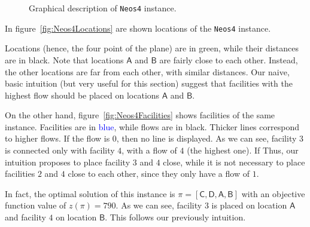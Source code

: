 \begin{figure}%
	\centering
	\qquad
	\caption{Graphical description of \texttt{Neos4} instance.}
	\label{fig:Neos4instance}
\end{figure}

In figure~\ref{fig:Neos4Locations}  are shown locations of the \texttt{Neos4} instance. 

Locations (hence, the four point of the plane) are in 
 \textcolor{verdescuro}{green}, while their distances are in black. Note that locations  $\mathsf A$ and  $\mathsf B$ are fairly close to each other. Instead, the other locations are far from each other, with similar distances. Our naive, basic intuition (but very useful for this section) suggest that facilities with the highest flow should be placed on locations  $\mathsf A$ and $\mathsf B$. 


On the other hand, figure~\ref{fig:Neos4Facilities} shows facilities of the same instance. Facilities are in \textcolor{blue}{blue}, while flows are in black. Thicker lines correspond to higher flows. If the flow is $0$, then no line is displayed. As we can see, facility $3$ is connected only with facility $4$, with a flow of $4$ (the highest one). If  Thus, our intuition proposes to place facility $3$ and $4$ close, while it is not necessary to place facilities $2$ and $4$ close to each other, since they only have a flow of $1$. 

In fact, the optimal solution of this instance  is $\pi=[\mathsf C,\mathsf D,\mathsf A,\mathsf B]$ with an objective function value of $z(\pi)=790$.
As we can see, facility $3$ is placed on location $\mathsf A$ and facility $4$ on location $\mathsf B$. This follows our previously intuition.

